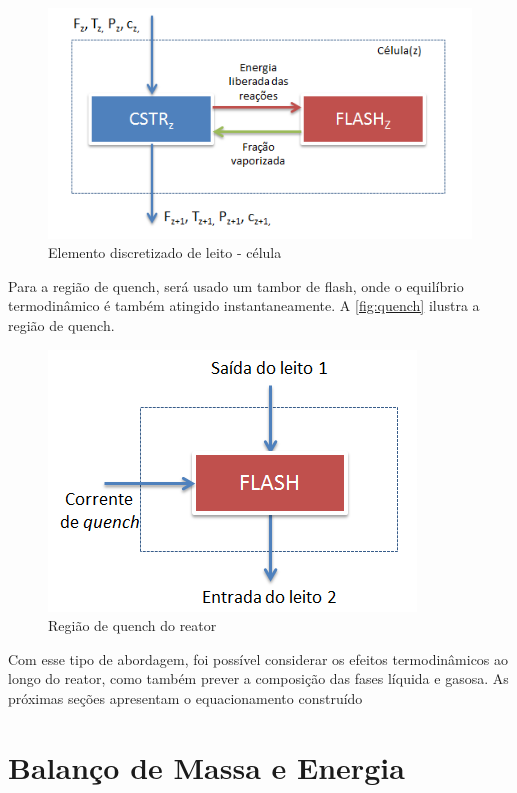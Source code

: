  \begin{figure}[htb]
 \centering \includegraphics[scale=0.75]{images/Chap3/celula.png}
 \caption{Elemento discretizado de leito - célula}
 \label{fig:celula}
 \end{figure}


Para a região de quench, será usado um tambor de flash, onde o equilíbrio
termodinâmico é também atingido instantaneamente. A \autoref{fig:quench} ilustra
a região de quench.

 \begin{figure}[htb]
 \centering \includegraphics[scale=0.75]{images/Chap3/quench.png}
 \caption{Região de quench do reator}
 \label{fig:quench}
 \end{figure}

Com esse tipo de abordagem, foi possível considerar os efeitos termodinâmicos
ao longo do reator, como também prever a composição das fases líquida e
gasosa. As próximas seções apresentam o equacionamento construído

\section{Balanço de Massa e Energia} \label{sec:balancomassaenergia}

